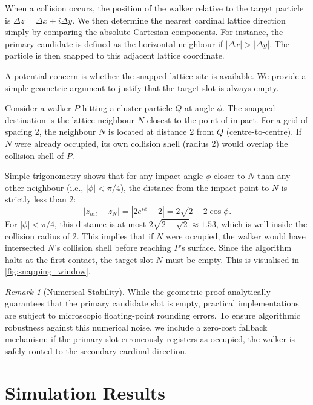 \documentclass[12pt, a4paper, oneside]{report}
\theoremstyle{remark}
\newtheorem{remark}[theorem]{Remark}
\begin{document}
When a collision occurs, the position of the walker relative to the target particle is $\Delta z = \Delta x + i\Delta y$. We then determine the nearest cardinal lattice direction simply by comparing the absolute Cartesian components. For instance, the primary candidate is defined as the horizontal neighbour if $|\Delta x| > |\Delta y|$. The particle is then snapped to this adjacent lattice coordinate.

A potential concern is whether the snapped lattice site is available. We provide a simple geometric argument to justify that the target slot is always empty.

Consider a walker $P$ hitting a cluster particle $Q$ at angle $\phi$. The snapped destination is the lattice neighbour $N$ closest to the point of impact. For a grid of spacing 2, the neighbour $N$ is located at distance 2 from $Q$ (centre-to-centre).
If $N$ were already occupied, its own collision shell (radius 2) would overlap the collision shell of $P$.

Simple trigonometry shows that for any impact angle $\phi$ closer to $N$ than any other neighbour (i.e., $|\phi| < \pi/4$), the distance from the impact point to $N$ is strictly less than 2:
\begin{equation*}
    |z_{hit} - z_{N}| = |2e^{i\phi} - 2| = 2\sqrt{2 - 2\cos\phi}.
\end{equation*}
For $|\phi| < \pi/4$, this distance is at most $2\sqrt{2 - \sqrt{2}} \approx 1.53$, which is well inside the collision radius of 2.
This implies that if $N$ were occupied, the walker would have intersected $N$'s collision shell before reaching $P$'s surface. Since the algorithm halts at the first contact, the target slot $N$ must be empty. This is visualised in \cref{fig:snapping_window}.

\begin{remark}[Numerical Stability]
    While the geometric proof analytically guarantees that the primary candidate slot is empty, practical implementations are subject to microscopic floating-point rounding errors. To ensure algorithmic robustness against this numerical noise, we include a zero-cost fallback mechanism: if the primary slot erroneously registers as occupied, the walker is safely routed to the secondary cardinal direction.
\end{remark}

\chapter{Simulation Results}
\label{ch:results}
\end{document}
